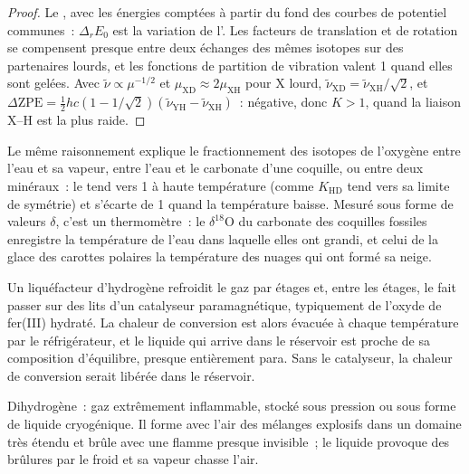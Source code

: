 \begin{proof}
Le , avec les énergies
comptées à partir du fond des courbes de potentiel communes~:
$\Delta_rE_0$ est la variation de l'. Les facteurs
de translation et de rotation se compensent presque entre deux échanges
des mêmes isotopes sur des partenaires lourds, et les fonctions de
partition de vibration valent 1 quand elles sont gelées. Avec
$\tilde\nu \propto \mu^{-1/2}$ et
$\mu_{\mathrm{XD}} \approx 2\mu_{\mathrm{XH}}$ pour X lourd, $\tilde\nu_{\mathrm{XD}} = \tilde\nu_{\mathrm{XH}}/\sqrt2$, et $\Delta\mathrm{ZPE} =
\frac12hc(1 - 1/\sqrt2)(\tilde\nu_{\mathrm{YH}} - \tilde\nu_{\mathrm{XH}})$~:
négative, donc $K > 1$, quand la liaison X--H est la plus raide.
\end{proof}

Le même raisonnement explique le fractionnement des isotopes de l'oxygène
entre l'eau et sa vapeur, entre l'eau et le carbonate d'une coquille, ou
entre deux minéraux~: le  tend vers 1 à haute
température (comme $K_{\mathrm{HD}}$ tend vers sa limite de symétrie) et
s'écarte de 1 quand la température baisse. Mesuré sous forme de valeurs
$\delta$, c'est un thermomètre~: le $\delta^{18}$O du carbonate des
coquilles fossiles enregistre la température de l'eau dans laquelle
elles ont grandi, et celui de la glace des carottes polaires la
température des nuages qui ont formé sa neige.

\begin{inthelab}
Un liquéfacteur d'hydrogène refroidit le gaz par étages et, entre les
étages, le fait passer sur des lits d'un catalyseur paramagnétique,
typiquement de l'oxyde de fer(III) hydraté. La chaleur de conversion est
alors évacuée à chaque température par le réfrigérateur, et le liquide
qui arrive dans le réservoir est proche de sa composition d'équilibre,
presque entièrement para. Sans le catalyseur, la chaleur de conversion
serait libérée dans le réservoir.
\end{inthelab}

\begin{safety}{}
Dihydrogène~: gaz extrêmement inflammable, stocké sous pression ou sous
forme de liquide cryogénique. Il forme avec l'air des mélanges explosifs
dans un domaine très étendu et brûle avec une flamme presque invisible~;
le liquide provoque des brûlures par le froid et sa vapeur chasse l'air.
\end{safety}

